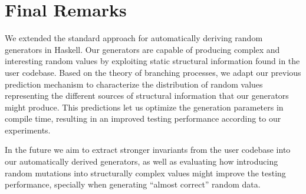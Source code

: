 \section{Final Remarks}

We extended the standard approach for automatically deriving random generators
in Haskell.
%
Our generators are capable of producing complex and interesting random values by
exploiting static structural information found in the user codebase.
%
Based on the theory of branching processes, we adapt our previous prediction
mechanism to characterize the distribution of random values representing the
different sources of structural information that our generators might produce.
%
This predictions let us optimize the generation parameters in compile time,
resulting in an improved testing performance according to our experiments.

In the future we aim to extract stronger invariants from the user codebase into
our automatically derived generators, as well as evaluating how introducing
random mutations into structurally complex values might improve the testing
performance, specially when generating ``almost correct'' random
data.